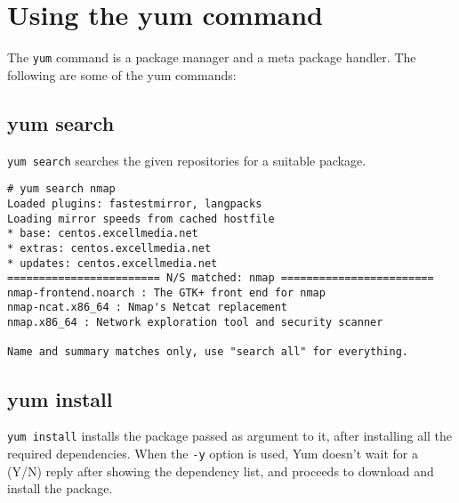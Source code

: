 \section{Using the yum command}
The \verb|yum| command is a package manager and a meta package handler. The following are some of the yum commands:

\subsection{yum search}
\verb|yum search| searches the given repositories for a suitable package. 

\vspace{-15pt}
\begin{verbatim}
# yum search nmap
Loaded plugins: fastestmirror, langpacks
Loading mirror speeds from cached hostfile
* base: centos.excellmedia.net
* extras: centos.excellmedia.net
* updates: centos.excellmedia.net
======================== N/S matched: nmap ========================
nmap-frontend.noarch : The GTK+ front end for nmap
nmap-ncat.x86_64 : Nmap's Netcat replacement
nmap.x86_64 : Network exploration tool and security scanner

Name and summary matches only, use "search all" for everything.
\end{verbatim}
\vspace{-10pt}

\subsection{yum install}
\verb|yum install| installs the package passed as argument to it, after installing all the required dependencies. When the \verb|-y| option is used, Yum doesn't wait for a (Y/N) reply after showing the dependency list, and proceeds to download and install the package. 

